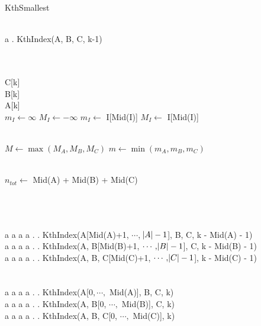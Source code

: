 \documentclass{article}
\begin{document}
\begin{algorithm}[H]
\caption{KthSmallest}
\begin{algorithmic}[1]

\\ \phantom a \phantom .
    \Return KthIndex(A, B, C, k-1)
\EndFunction

\\

\\
        \Return C[k]
    \EndIf
\\
        \Return B[k]
    \EndIf
\\
        \Return A[k]
    \EndIf
\\

        \State $m_I \gets \infty$
        \State $M_I \gets -\infty$
    \Else
        \State $m_I \gets$ I[Mid(I)] 
        \State $M_I \gets$ I[Mid(I)] 
    \EndIf
    \EndFor

\\
    \State $M \gets \max(M_A, M_B, M_C)$
    \State $m \gets \min(m_A, m_B, m_C)$

\\
    \State $n_{tot} \gets$ Mid(A) + Mid(B) + Mid(C)

\\

    \\
        \\ \phantom a \phantom a \phantom a \phantom a \phantom . \phantom .
        \Return KthIndex(A[Mid(A)+1, $\cdots$, $\abs{A} - 1$], B, C, k - Mid(A) - 1)
        \\ \phantom a \phantom a \phantom a \phantom a \phantom . \phantom .
        \Return KthIndex(A, B[Mid(B)+1, $\cdots, \abs{B} - 1$], C, k - Mid(B) - 1)
        \Else
        \\ \phantom a \phantom a \phantom a \phantom a \phantom . \phantom .
        \Return KthIndex(A, B, C[Mid(C)+1, $\cdots, \abs{C} - 1$], k - Mid(C) - 1)
        \EndIf
        \\
    \Else
    \\
        \\ \phantom a \phantom a \phantom a \phantom a \phantom . \phantom .
        \Return KthIndex(A[$0, \cdots,$ Mid(A)], B, C, k)
        \\ \phantom a \phantom a \phantom a \phantom a \phantom . \phantom .
        \Return KthIndex(A, B[0, $\cdots,$ Mid(B)], C, k)
        \Else
        \\ \phantom a \phantom a \phantom a \phantom a \phantom . \phantom .
        \Return KthIndex(A, B, C[0, $\cdots,$ Mid(C)], k)
        \EndIf
        \\
    \EndIf
\\
\EndFunction
\end{algorithmic}
\end{algorithm}
\end{document}
